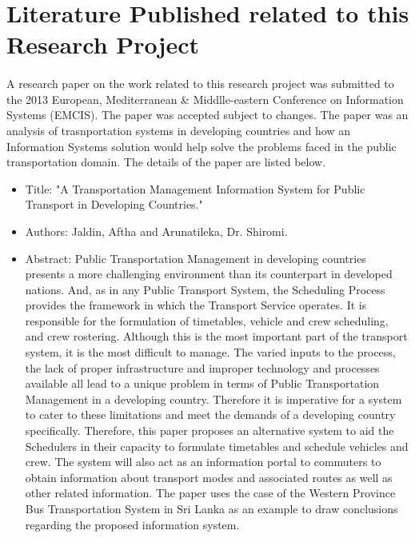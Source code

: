 \newpage

\section{Literature Published related to this Research Project}

\paragraph{} A research paper on the work related to this research project was submitted to the 2013 European, Mediterranean \& Middlle-eastern Conference on Information Systems (EMCIS). The paper was accepted subject to changes. The paper was an analysis of trasnportation systems in developing countries and how an Information Systems solution would help solve the problems faced in the public transportation domain. The details of the paper are listed below.

\begin {itemize}
\item Title: "A Transportation Management Information System for Public Transport in Developing Countries."
\item Authors: Jaldin, Aftha and Arunatileka, Dr. Shiromi.
\item Abstract: Public Transportation Management in developing countries presents a more challenging environment than its counterpart in developed nations. And, as in any Public Transport System, the Scheduling Process provides the framework in which the Transport Service operates. It is responsible for the formulation of timetables, vehicle and crew scheduling, and crew rostering. Although this is the most important part of the transport system, it is the most difficult to manage. The varied inputs to the process, the lack of proper infrastructure and improper technology and processes available all lead to a unique problem in terms of Public Transportation Management in a developing country. Therefore it is imperative for a system to cater to these limitations and meet the demands of a developing country specifically. Therefore, this paper proposes an alternative system to aid the Schedulers in their capacity to formulate timetables and schedule vehicles and crew. The system will also act as an information portal to commuters to obtain information about transport modes and associated routes as well as other related information. The paper uses the case of the Western Province Bus Transportation System in Sri Lanka as an example to draw conclusions regarding the proposed information system.
\end {itemize}